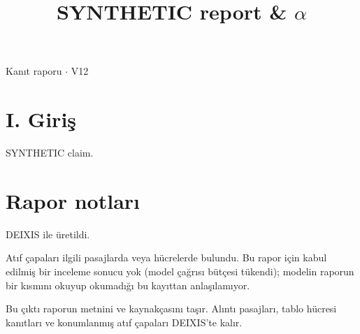 \documentclass[journal]{IEEEtran}
\begin{document}
\renewcommand{\abstractname}{Özet}
\renewcommand{\IEEEkeywordsname}{Dizin Terimleri}
\renewcommand{\refname}{Kaynaklar}

\title{SYNTHETIC report \& \ensuremath{\alpha}}

\maketitle

\noindent Kanıt raporu \ensuremath{\cdot} V12

\section*{I. Giriş}

SYNTHETIC claim. \cite{Synth26}

\section*{Rapor notları}

DEIXIS ile üretildi.

Atıf çapaları ilgili pasajlarda veya hücrelerde bulundu. Bu rapor için kabul edilmiş bir inceleme sonucu yok (model çağrısı bütçesi tükendi); modelin raporun bir kısmını okuyup okumadığı bu kayıttan anlaşılamıyor.

Bu çıktı raporun metnini ve kaynakçasını taşır. Alıntı pasajları, tablo hücresi kanıtları ve konumlanmış atıf çapaları DEIXIS'te kalır.




\end{document}
